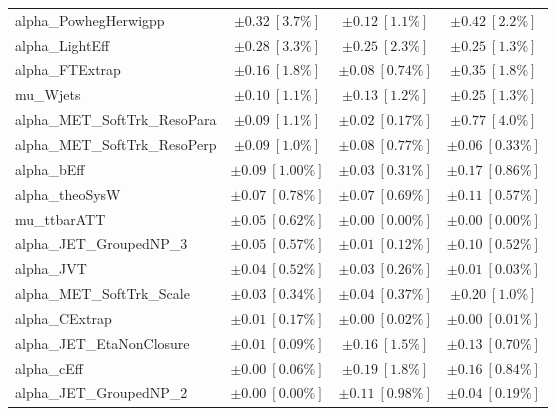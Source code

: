 \begin{table}
\begin{center}
\begin{tabular*}{\textwidth}{@{\extracolsep{\fill}}lccc}
alpha\_PowhegHerwigpp         & $\pm 0.32\ [3.7\%] $          & $\pm 0.12\ [1.1\%] $          & $\pm 0.42\ [2.2\%] $       \\
alpha\_LightEff         & $\pm 0.28\ [3.3\%] $          & $\pm 0.25\ [2.3\%] $          & $\pm 0.25\ [1.3\%] $       \\
alpha\_FTExtrap         & $\pm 0.16\ [1.8\%] $          & $\pm 0.08\ [0.74\%] $          & $\pm 0.35\ [1.8\%] $       \\
mu\_Wjets         & $\pm 0.10\ [1.1\%] $          & $\pm 0.13\ [1.2\%] $          & $\pm 0.25\ [1.3\%] $       \\
alpha\_MET\_SoftTrk\_ResoPara         & $\pm 0.09\ [1.1\%] $          & $\pm 0.02\ [0.17\%] $          & $\pm 0.77\ [4.0\%] $       \\
alpha\_MET\_SoftTrk\_ResoPerp         & $\pm 0.09\ [1.0\%] $          & $\pm 0.08\ [0.77\%] $          & $\pm 0.06\ [0.33\%] $       \\
alpha\_bEff         & $\pm 0.09\ [1.00\%] $          & $\pm 0.03\ [0.31\%] $          & $\pm 0.17\ [0.86\%] $       \\
alpha\_theoSysW         & $\pm 0.07\ [0.78\%] $          & $\pm 0.07\ [0.69\%] $          & $\pm 0.11\ [0.57\%] $       \\
mu\_ttbarATT         & $\pm 0.05\ [0.62\%] $          & $\pm 0.00\ [0.00\%] $          & $\pm 0.00\ [0.00\%] $       \\
alpha\_JET\_GroupedNP\_3         & $\pm 0.05\ [0.57\%] $          & $\pm 0.01\ [0.12\%] $          & $\pm 0.10\ [0.52\%] $       \\
alpha\_JVT         & $\pm 0.04\ [0.52\%] $          & $\pm 0.03\ [0.26\%] $          & $\pm 0.01\ [0.03\%] $       \\
alpha\_MET\_SoftTrk\_Scale         & $\pm 0.03\ [0.34\%] $          & $\pm 0.04\ [0.37\%] $          & $\pm 0.20\ [1.0\%] $       \\
alpha\_CExtrap         & $\pm 0.01\ [0.17\%] $          & $\pm 0.00\ [0.02\%] $          & $\pm 0.00\ [0.01\%] $       \\
alpha\_JET\_EtaNonClosure         & $\pm 0.01\ [0.09\%] $          & $\pm 0.16\ [1.5\%] $          & $\pm 0.13\ [0.70\%] $       \\
alpha\_cEff         & $\pm 0.00\ [0.06\%] $          & $\pm 0.19\ [1.8\%] $          & $\pm 0.16\ [0.84\%] $       \\
alpha\_JET\_GroupedNP\_2         & $\pm 0.00\ [0.00\%] $          & $\pm 0.11\ [0.98\%] $          & $\pm 0.04\ [0.19\%] $       \\

\end{tabular*}
\end{center}
\end{table}
